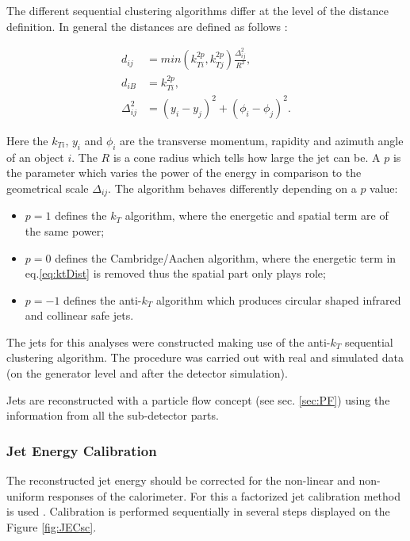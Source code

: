 The different sequential clustering algorithms differ at the level of the distance definition. In general the distances are defined as follows \cite{Cacciari:2008gp}:

\begin{align}
 d_{ij} & = min(k_{Ti}^{2p}, k_{Tj}^{2p}) \frac{\Delta_{ij}^{2}}{R^{2}},\label{eq:ktDist} \\
 d_{iB} & = k_{Ti}^{2p}, \\
 \Delta_{ij}^{2} & = (y_{i} - y_{j})^{2} + (\phi_{i} - \phi_{j})^{2}.
\end{align}

Here the $k_{Ti}$, $y_{i}$ and $\phi_i$ are the transverse momentum, rapidity and azimuth angle of an object $i$. The $R$ is a cone radius which tells 
how large the jet can be. A $p$ is the parameter which varies the power of the energy in comparison to the geometrical scale $\Delta_{ij}$.
The algorithm behaves differently depending on a $p$ value:

\begin{itemize}
 \item $p = 1$ defines the $k_{T}$ algorithm, where the energetic and spatial term are of the same power;
 \item $p = 0$ defines the Cambridge/Aachen algorithm, where the energetic term in eq.\ref{eq:ktDist} is removed thus the spatial part only plays role;
 \item $p = -1$ defines the anti-$k_{T}$ algorithm which produces circular shaped infrared and collinear safe jets.
\end{itemize}

The jets for this analyses were constructed making use of the anti-$k_{T}$ sequential clustering algorithm. The procedure was carried out with real and
simulated data (on the generator level and after the detector simulation).

Jets are reconstructed with a particle flow concept (see sec. \ref{sec:PF}) using the information from all the sub-detector parts.

\subsubsection{Jet Energy Calibration}\label{ssec:JCal}

The reconstructed jet energy should be corrected for the non-linear and non-uniform responses of the calorimeter. For this a factorized jet calibration
method is used \cite{2011JInst...611002C}. Calibration is performed sequentially in several steps displayed on the Figure \ref{fig:JECsc}.

